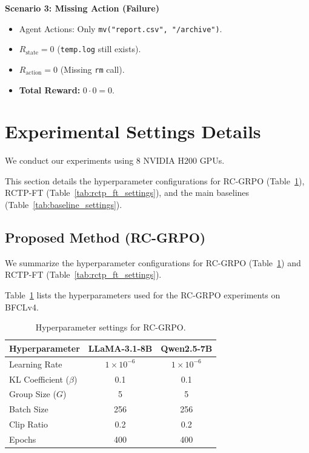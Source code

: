 \documentclass{article}
\theoremstyle{plain}
\theoremstyle{definition}
\theoremstyle{remark}
\begin{document}
\textbf{Scenario 3: Missing Action (Failure)}
\begin{itemize}
    \item Agent Actions: Only \texttt{mv("report.csv", "/archive")}.
    \item $R_{\text{state}} = 0$ (\texttt{temp.log} still exists).
    \item $R_{\text{action}} = 0$ (Missing \texttt{rm} call).
    \item \textbf{Total Reward:} $0 \cdot 0 = 0$.
\end{itemize}


\section{Experimental Settings Details}
\label{app:experiment_settings}

We conduct our experiments using 8 NVIDIA H200 GPUs.

This section details the hyperparameter configurations for RC-GRPO (Table~\ref{tab:rc_grpo_settings}), RCTP-FT (Table~\ref{tab:rctp_ft_settings}), and the main baselines (Table~\ref{tab:baseline_settings}).

\subsection{Proposed Method (RC-GRPO)}

We summarize the hyperparameter configurations for RC-GRPO (Table~\ref{tab:rc_grpo_settings}) and RCTP-FT (Table~\ref{tab:rctp_ft_settings}).

Table~\ref{tab:rc_grpo_settings} lists the hyperparameters used for the RC-GRPO experiments on BFCLv4.

\begin{table}[h]
    \centering
    \caption{Hyperparameter settings for RC-GRPO.}
    \label{tab:rc_grpo_settings}
    \begin{tabular}{lcc}
        \toprule
        \textbf{Hyperparameter} & \textbf{LLaMA-3.1-8B} & \textbf{Qwen2.5-7B} \\
        \midrule
        Learning Rate & $1 \times 10^{-6}$ & $1 \times 10^{-6}$ \\
        KL Coefficient ($\beta$) & 0.1 & 0.1 \\
        Group Size ($G$) & 5 & 5 \\
        Batch Size & 256 & 256 \\
        Clip Ratio & 0.2 & 0.2 \\
        Epochs & 400 & 400 \\
        \bottomrule
    \end{tabular}
\end{table}
\end{document}
